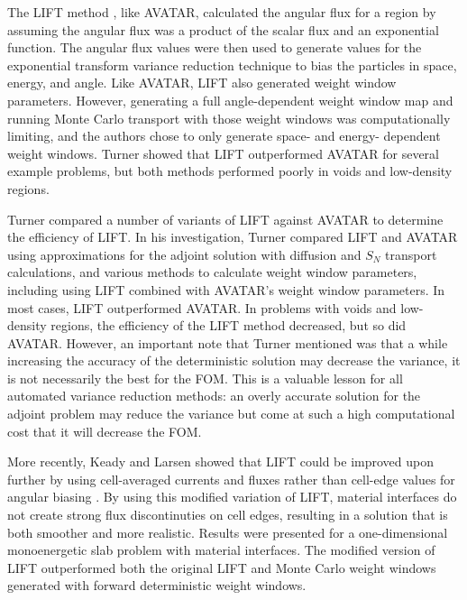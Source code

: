 The LIFT method \cite{turner_automatic_1997, turner_automatic_1997-1}, like
AVATAR, calculated the angular flux for a region by assuming the angular flux
was a product of the scalar flux and an exponential function. The angular flux
values were then used to generate values for the exponential transform variance
reduction
technique to bias the particles in space, energy, and angle. Like AVATAR, LIFT
also generated weight window parameters. However, generating a full
angle-dependent weight window map and running Monte Carlo transport with those
weight windows was computationally limiting, and the authors chose to only
generate space- and energy- dependent weight windows. Turner showed that LIFT
outperformed AVATAR for several example problems, but both methods performed
poorly in voids and low-density regions.

Turner compared a number of variants of LIFT \cite{turner_automatic_1997-1}
against AVATAR to
determine the efficiency of LIFT. In his investigation, Turner compared LIFT and
AVATAR using
approximations for the adjoint solution with diffusion and $S_N$ transport
calculations, and
various methods to calculate weight window parameters, including using LIFT
combined
with AVATAR's weight window parameters. In most cases, LIFT outperformed AVATAR.
In problems
with voids and low-density regions, the efficiency of the LIFT method decreased,
but so did
AVATAR. However, an important note that Turner mentioned was that a while
increasing the
accuracy of the deterministic solution may decrease the variance, it is not
necessarily the
best for the FOM. This is a valuable lesson for all automated variance reduction
methods: an
overly accurate solution for the adjoint problem may reduce the variance but
come at such
a high computational cost that it will decrease the FOM.

More recently, Keady and Larsen showed that LIFT could be improved upon further
by using cell-averaged currents and fluxes rather than cell-edge values for
angular biasing \cite{keady_modified_2015}. By using this modified variation of
LIFT, material interfaces do not create strong flux discontinuties on cell
edges, resulting in a solution that is both smoother and more realistic.
Results were presented for a
one-dimensional monoenergetic slab problem with material interfaces. The
modified version of LIFT outperformed both the original LIFT and Monte Carlo
weight windows generated with forward deterministic weight windows.



